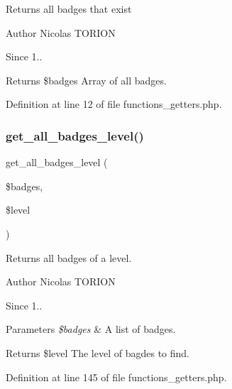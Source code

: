 Returns all badges that exist

\begin{DoxyAuthor}{Author}
Nicolas T\+O\+R\+I\+ON 
\end{DoxyAuthor}
\begin{DoxySince}{Since}
1.. 
\end{DoxySince}
\begin{DoxyReturn}{Returns}
\$badges Array of all badges. 
\end{DoxyReturn}


Definition at line 12 of file functions\+\_\+getters.\+php.

\mbox{\label{functions__getters_8php_ab8d88d98b70855358641934ab1c74029}} 
\subsubsection{\texorpdfstring{get\+\_\+all\+\_\+badges\+\_\+level()}{get\_all\_badges\_level()}}
{\footnotesize\ttfamily get\+\_\+all\+\_\+badges\+\_\+level (\begin{DoxyParamCaption}\item[{}]{\$badges,  }\item[{}]{\$level }\end{DoxyParamCaption})}

Returns all badges of a level.

\begin{DoxyAuthor}{Author}
Nicolas T\+O\+R\+I\+ON 
\end{DoxyAuthor}
\begin{DoxySince}{Since}
1.. 
\end{DoxySince}

\begin{DoxyParams}{Parameters}
{\em \$badges} & A list of badges. \\
\hline
\end{DoxyParams}
\begin{DoxyReturn}{Returns}
\$level The level of bagdes to find. 
\end{DoxyReturn}


Definition at line 145 of file functions\+\_\+getters.\+php.

